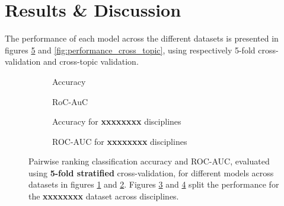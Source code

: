 \documentclass[runningheads]{llncs}
\begin{document}
\section{Results \& Discussion}

The performance of each model across the different datasets is presented 
in figures \ref{fig:performance_k_fold} and \ref{fig:performance_cross_topic}, 
using respectively 5-fold cross-validation and cross-topic validation.  

\begin{figure}
	\begin{subfigure}[t]{0.5\linewidth}
		\centering
		\scalebox{0.4}{}
		\caption{Accuracy}
		\label{fig:acc_kfold}
	\end{subfigure}%
	\qquad
	\begin{subfigure}[t]{0.5\linewidth}
		\centering
		\scalebox{0.4}{}
		\caption{RoC-AuC}
		\label{fig:AUC_kfold}
	\end{subfigure}
	
	\begin{subfigure}[t]{0.5\linewidth}
		\centering
		\scalebox{0.4}{}
		\caption{Accuracy for \textbf{xxxxxxxx} disciplines}
		\label{fig:acc_dalite_kfold}
	\end{subfigure}%
	\qquad
	\begin{subfigure}[t]{0.5\linewidth}
		\centering
		\scalebox{0.4}{}
		\caption{ROC-AUC for \textbf{xxxxxxxx} disciplines}
		\label{fig:AUC_dalite_kfold}
	\end{subfigure}	
	\caption{Pairwise ranking classification accuracy and ROC-AUC, evaluated 
	using \textbf{5-fold stratified} cross-validation, for 
		different models across datasets in figures \ref{fig:acc_kfold} and 
		\ref{fig:AUC_kfold}. Figures \ref{fig:acc_dalite_kfold} and 
		\ref{fig:AUC_dalite_kfold} split the performance for the  
		\textbf{xxxxxxxx} dataset across disciplines.}
	\label{fig:performance_k_fold}
\end{figure}
\end{document}
